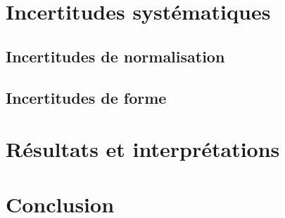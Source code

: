\section{Incertitudes systématiques}
\subsection{Incertitudes de normalisation}
\subsection{Incertitudes de forme}

\section{Résultats et interprétations}

\section{Conclusion}
